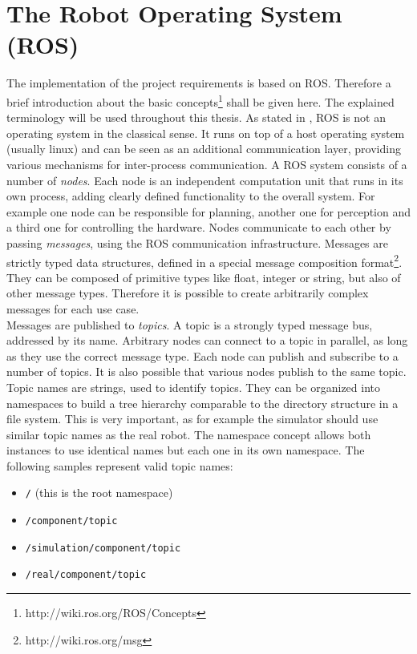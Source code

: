 \section{The Robot Operating System (ROS)}

The implementation of the project requirements is based on ROS. Therefore a brief introduction about the basic concepts\footnote{http://wiki.ros.org/ROS/Concepts} shall be given here. The explained terminology will be used throughout this thesis. As stated in \cite{quigley2009}, ROS is not an operating system in the classical sense. It runs on top of a host operating system (usually linux) and can be seen as an additional communication layer, providing various mechanisms for inter-process communication. A ROS system consists of a number of \emph{nodes}. Each node is an independent computation unit that runs in its own process, adding clearly defined functionality to the overall system. For example one node can be responsible for planning, another one for perception and a third one for controlling the hardware. Nodes communicate to each other by passing \emph{messages}, using the ROS communication infrastructure. Messages are strictly typed data structures, defined in a special message composition format\footnote{http://wiki.ros.org/msg}. They can be composed of primitive types like float, integer or string, but also of other message types. Therefore it is possible to create arbitrarily complex messages for each use case. \\

Messages are published to \emph{topics}. A topic is a strongly typed message bus, addressed by its name. Arbitrary nodes can connect to a topic in parallel, as long as they use the correct message type. Each node can publish and subscribe to a number of topics. It is also possible that various nodes publish to the same topic. Topic names are strings, used to identify topics. They can be organized into namespaces to build a tree hierarchy comparable to the directory structure in a file system. This is very important, as for example the simulator should use similar topic names as the real robot. The namespace concept allows both instances to use identical names but each one in its own namespace. The following samples represent valid topic names:
\begin{itemize}
\item \texttt{/} (this is the root namespace)
\item \texttt{/component/topic}
\item \texttt{/simulation/component/topic}
\item \texttt{/real/component/topic}
\end{itemize}

